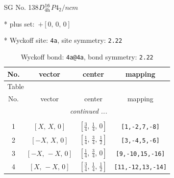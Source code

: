 \documentclass[fleqn,8pt]{jsarticle}
\begin{document}
\setcounter{MaxMatrixCols}{32}

\renewcommand{\tablename}{Table~}
\renewcommand{\figurename}{Figure~}
\begin{center}
\LARGE
SG No. 138\quad$D_{\rm 4h}^{16}$\quad$P4_2/ncm$\quad[ tetragonal ]
\end{center}

* plus set:\,\,\,$+\left[ 0,\, 0,\, 0 \right]$


* Wyckoff site: {\tt 4a}, site symmetry: {\tt 2.22}
\renewcommand{\arraystretch}{1.2}
\begin{longtable}{cccc}
\caption{Wyckoff bond: {\tt 4a@4a}, bond symmetry: {\tt 2.22}}
 \\
 \hline \hline
No. & vector & center & mapping \\ \hline \endfirsthead

\multicolumn{3}{l}{\tablename\ \thetable{}} \\
 \hline \hline
No. & vector & center & mapping \\ \hline \endhead

 \hline \hline
\multicolumn{3}{r}{\footnotesize\it continued ...} \\ \endfoot

 \hline \hline
\multicolumn{3}{r}{} \\ \endlastfoot

1 & $\left[ X,\, X,\, 0 \right]$ & $\left[ \frac{3}{4},\, \frac{1}{4},\, 0 \right]$ & {\tt [1,-2,7,-8]} \\ \hline
2 & $\left[ - X,\, X,\, 0 \right]$ & $\left[ \frac{1}{4},\, \frac{3}{4},\, \frac{1}{2} \right]$ & {\tt [3,-4,5,-6]} \\ \hline
3 & $\left[ - X,\, - X,\, 0 \right]$ & $\left[ \frac{1}{4},\, \frac{3}{4},\, 0 \right]$ & {\tt [9,-10,15,-16]} \\ \hline
4 & $\left[ X,\, - X,\, 0 \right]$ & $\left[ \frac{3}{4},\, \frac{1}{4},\, \frac{1}{2} \right]$ & {\tt [11,-12,13,-14]} \\
\end{longtable}
\renewcommand{\arraystretch}{1.2}
\end{document}
